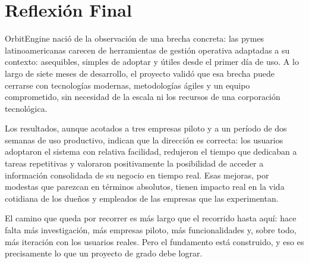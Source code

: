 \section{Reflexión Final}\label{reflexiuxf3n-final}

OrbitEngine nació de la observación de una brecha concreta: las pymes latinoamericanas carecen de herramientas de gestión operativa adaptadas a su contexto: asequibles, simples de adoptar y útiles desde el primer día de uso. A lo largo de siete meses de desarrollo, el proyecto validó que esa brecha puede cerrarse con tecnologías modernas, metodologías ágiles y un equipo comprometido, sin necesidad de la escala ni los recursos de una corporación tecnológica.

Los resultados, aunque acotados a tres empresas piloto y a un período de dos semanas de uso productivo, indican que la dirección es correcta: los usuarios adoptaron el sistema con relativa facilidad, redujeron el tiempo que dedicaban a tareas repetitivas y valoraron positivamente la posibilidad de acceder a información consolidada de su negocio en tiempo real. Esas mejoras, por modestas que parezcan en términos absolutos, tienen impacto real en la vida cotidiana de los dueños y empleados de las empresas que las experimentan.

El camino que queda por recorrer es más largo que el recorrido hasta aquí: hace falta más investigación, más empresas piloto, más funcionalidades y, sobre todo, más iteración con los usuarios reales. Pero el fundamento está construido, y eso es precisamente lo que un proyecto de grado debe lograr.
